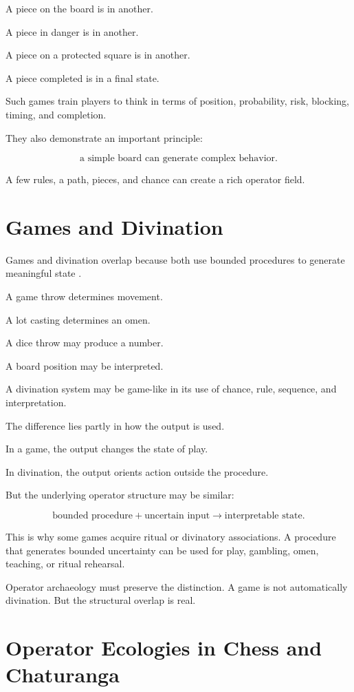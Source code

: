 \documentclass[11pt]{book}
\begin{document}
A piece on the board is in another.

A piece in danger is in another.

A piece on a protected square is in another.

A piece completed is in a final state.

Such games train players to think in terms of position, probability, risk, blocking, timing, and completion.

They also demonstrate an important principle:

\[
\text{a simple board can generate complex behavior}.
\]

A few rules, a path, pieces, and chance can create a rich operator field.

\section{Games and Divination}

Games and divination overlap because both use bounded procedures to generate meaningful state \cite{Finkel2007AncientBoardGames,Loewe1994DivinationMythologyMonarchy,WilhelmBaynes1967IChing}.

A game throw determines movement.

A lot casting determines an omen.

A dice throw may produce a number.

A board position may be interpreted.

A divination system may be game-like in its use of chance, rule, sequence, and interpretation.

The difference lies partly in how the output is used.

In a game, the output changes the state of play.

In divination, the output orients action outside the procedure.

But the underlying operator structure may be similar:

\[
\text{bounded procedure}
+
\text{uncertain input}
\rightarrow
\text{interpretable state}.
\]

This is why some games acquire ritual or divinatory associations. A procedure that generates bounded uncertainty can be used for play, gambling, omen, teaching, or ritual rehearsal.

Operator archaeology must preserve the distinction. A game is not automatically divination. But the structural overlap is real.

\section{Operator Ecologies in Chess and Chaturanga}
\end{document}
